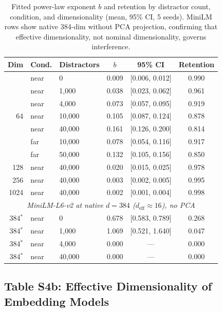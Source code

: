 \documentclass[11pt]{article}
\begin{document}
\begin{table}[!ht]
\centering
\caption{Fitted power-law exponent $b$ and retention by distractor count, condition, and dimensionality (mean, 95\% CI, 5 seeds). MiniLM rows show native 384-dim without PCA projection, confirming that effective dimensionality, not nominal dimensionality, governs interference.}
\label{tab:interference}
\small
\begin{tabular}{@{}rllccc@{}}
\toprule
\textbf{Dim} & \textbf{Cond.} & \textbf{Distractors} & \textbf{$b$} & \textbf{95\% CI} & \textbf{Retention} \\
\midrule
\multirow{7}{*}{64} & near & 0 & 0.009 & [0.006, 0.012] & 0.990 \\
 & near & 1{,}000 & 0.038 & [0.023, 0.062] & 0.961 \\
 & near & 4{,}000 & 0.073 & [0.057, 0.095] & 0.919 \\
 & near & 10{,}000 & 0.105 & [0.087, 0.124] & 0.878 \\
 & near & 40{,}000 & 0.161 & [0.126, 0.200] & 0.814 \\
 & far & 10{,}000 & 0.078 & [0.054, 0.116] & 0.917 \\
 & far & 50{,}000 & 0.132 & [0.105, 0.156] & 0.850 \\
\midrule
128 & near & 40{,}000 & 0.020 & [0.015, 0.025] & 0.978 \\
256 & near & 40{,}000 & 0.003 & [0.002, 0.005] & 0.995 \\
1024 & near & 40{,}000 & 0.002 & [0.001, 0.004] & 0.998 \\
\midrule
\multicolumn{6}{c}{\textit{MiniLM-L6-v2 at native $d = 384$ ($d_\text{eff} \approx 16$), no PCA}} \\
\midrule
384$^*$ & near & 0 & 0.678 & [0.583, 0.789] & 0.268 \\
384$^*$ & near & 1{,}000 & 1.069 & [0.521, 1.640] & 0.047 \\
384$^*$ & near & 4{,}000 & 0.000 & --- & 0.000 \\
384$^*$ & near & 40{,}000 & 0.000 & --- & 0.000 \\
\bottomrule
\end{tabular}
\end{table}

\subsection*{Table S4b: Effective Dimensionality of Embedding Models}
\end{document}
